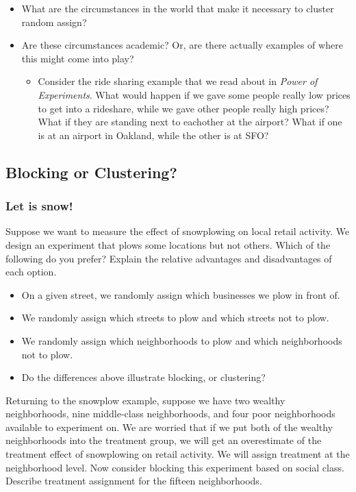 \documentclass[
]{article}
\providecommand{\tightlist}{%
  \setlength{\itemsep}{0pt}\setlength{\parskip}{0pt}}
\begin{document}
\begin{itemize}
\tightlist
\item
  What are the circumstances in the world that make it necessary to cluster random assign?
\item
  Are these circumstances academic? Or, are there actually examples of where this might come into play?

  \begin{itemize}
  \tightlist
  \item
    Consider the ride sharing example that we read about in \emph{Power of Experiments}. What would happen if we gave some people really low prices to get into a rideshare, while we gave other people really high prices? What if they are standing next to eachother at the airport? What if one is at an airport in Oakland, while the other is at SFO?
  \end{itemize}
\end{itemize}

\hypertarget{blocking-or-clustering}{%
\subsection{Blocking or Clustering?}\label{blocking-or-clustering}}

\hypertarget{let-is-snow}{%
\subsubsection{Let is snow!}\label{let-is-snow}}

Suppose we want to measure the effect of snowplowing on local retail activity. We design an experiment that plows some locations but not others. Which of the following do you prefer? Explain the relative advantages and disadvantages of each option.

\begin{itemize}
\tightlist
\item
  On a given street, we randomly assign which businesses we plow in front of.
\item
  We randomly assign which streets to plow and which streets not to plow.
\item
  We randomly assign which neighborhoods to plow and which neighborhoods not to plow.
\item
  Do the differences above illustrate blocking, or clustering?
\end{itemize}

Returning to the snowplow example, suppose we have two wealthy neighborhoods, nine middle-class neighborhoods, and four poor neighborhoods available to experiment on. We are worried that if we put both of the wealthy neighborhoods into the treatment group, we will get an overestimate of the treatment effect of snowplowing on retail activity.
We will assign treatment at the neighborhood level. Now consider blocking this experiment based on social class. Describe treatment assignment for the fifteen neighborhoods.
\end{document}
